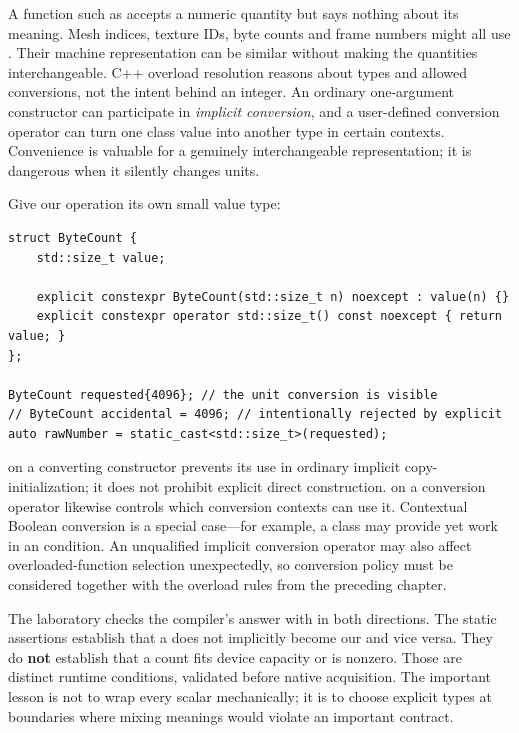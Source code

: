 \hypertarget{05-engine-i-ch004-the-first-bug-is-possible-before-we-load-a-file-4096-of-what}{}

A function such as  accepts a numeric quantity but says nothing about its meaning. Mesh indices, texture IDs, byte counts and frame numbers might all use . Their machine representation can be similar without making the quantities interchangeable. C++ overload resolution reasons about types and allowed conversions, not the intent behind an integer. An ordinary one-argument constructor can participate in \emph{implicit conversion}, and a user-defined conversion operator can turn one class value into another type in certain contexts. Convenience is valuable for a genuinely interchangeable representation; it is dangerous when it silently changes units.

Give our operation its own small value type:

\begin{verbatim}
struct ByteCount {
    std::size_t value;

    explicit constexpr ByteCount(std::size_t n) noexcept : value(n) {}
    explicit constexpr operator std::size_t() const noexcept { return value; }
};

ByteCount requested{4096}; // the unit conversion is visible
// ByteCount accidental = 4096; // intentionally rejected by explicit
auto rawNumber = static_cast<std::size_t>(requested);
\end{verbatim}

 on a converting constructor prevents its use in ordinary implicit copy-initialization; it does not prohibit explicit direct construction.  on a conversion operator likewise controls which conversion contexts can use it. Contextual Boolean conversion is a special case---for example, a class may provide  yet work in an  condition. An unqualified implicit conversion operator may also affect overloaded-function selection unexpectedly, so conversion policy must be considered together with the overload rules from the preceding chapter.

The laboratory checks the compiler's answer with  in both directions. The static assertions establish that a  does not implicitly become our  and vice versa. They do \textbf{not} establish that a count fits device capacity or is nonzero. Those are distinct runtime conditions, validated before native acquisition. The important lesson is not to wrap every scalar mechanically; it is to choose explicit types at boundaries where mixing meanings would violate an important contract.

